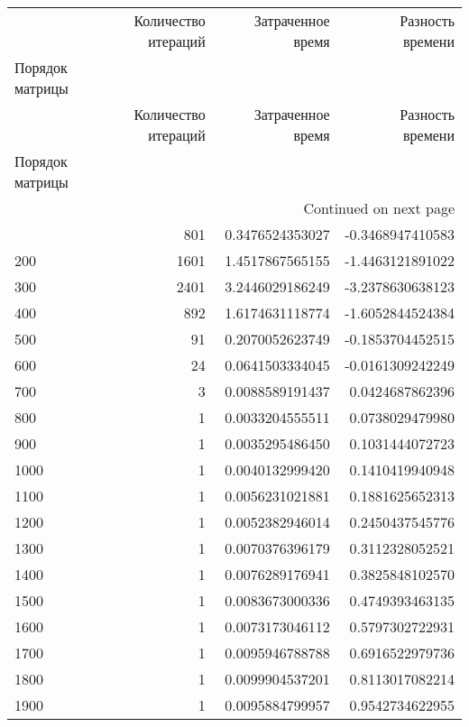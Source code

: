\begin{longtable}{lrrr}
\toprule
 & Количество итераций & Затраченное время & Разность времени \\
Порядок матрицы &  &  &  \\
\midrule
\endfirsthead
\toprule
 & Количество итераций & Затраченное время & Разность времени \\
Порядок матрицы &  &  &  \\
\midrule
\endhead
\midrule
\multicolumn{4}{r}{Continued on next page} \\
\midrule
\endfoot
\bottomrule
\endlastfoot
100 & 801 & 0.3476524353027 & -0.3468947410583 \\
200 & 1601 & 1.4517867565155 & -1.4463121891022 \\
300 & 2401 & 3.2446029186249 & -3.2378630638123 \\
400 & 892 & 1.6174631118774 & -1.6052844524384 \\
500 & 91 & 0.2070052623749 & -0.1853704452515 \\
600 & 24 & 0.0641503334045 & -0.0161309242249 \\
700 & 3 & 0.0088589191437 & 0.0424687862396 \\
800 & 1 & 0.0033204555511 & 0.0738029479980 \\
900 & 1 & 0.0035295486450 & 0.1031444072723 \\
1000 & 1 & 0.0040132999420 & 0.1410419940948 \\
1100 & 1 & 0.0056231021881 & 0.1881625652313 \\
1200 & 1 & 0.0052382946014 & 0.2450437545776 \\
1300 & 1 & 0.0070376396179 & 0.3112328052521 \\
1400 & 1 & 0.0076289176941 & 0.3825848102570 \\
1500 & 1 & 0.0083673000336 & 0.4749393463135 \\
1600 & 1 & 0.0073173046112 & 0.5797302722931 \\
1700 & 1 & 0.0095946788788 & 0.6916522979736 \\
1800 & 1 & 0.0099904537201 & 0.8113017082214 \\
1900 & 1 & 0.0095884799957 & 0.9542734622955 \\
\end{longtable}
